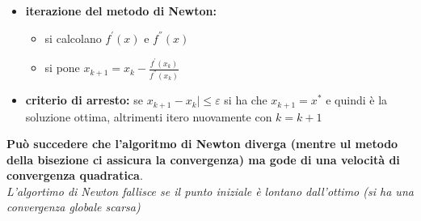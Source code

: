 \documentclass[a4paper,12pt, oneside]{book}
\begin{document}
\begin{enumerate}
\begin{itemize}
    \item \textbf{iterazione del metodo di Newton:}
    \begin{itemize}
      \item si calcolano $f^{'}(x)$ e $f^{''}(x)$
      \item si pone $x_{k+1}=x_k-\frac{f^{'}(x_k)}{f^{''}(x_k)}$
    \end{itemize}
    \item \textbf{criterio di arresto:} se $x_{k+1}-x_k|\leq
    \varepsilon$ si ha che $x_{k+1}=x^*$ e quindi è la soluzione
    ottima, altrimenti itero nuovamente con $k=k+1$
  \end{itemize}
  \textbf{Può succedere che l'algoritmo di Newton diverga (mentre ul
    metodo della bisezione ci assicura la convergenza) ma gode di
    una velocità di convergenza quadratica}.\\
  \textit{L'algortimo di Newton fallisce se il punto iniziale è
    lontano dall'ottimo (si ha una convergenza globale scarsa)}
\end{enumerate}
\end{document}
